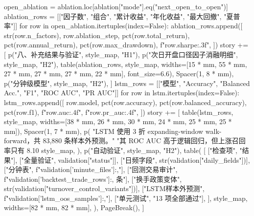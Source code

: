 \documentclass[UTF8,a4paper,fontset=fandol]{ctexart}
\begin{document}
\begin{ProjectCode}
    open_ablation = ablation.loc[ablation["mode"].eq("next_open_to_open")]
    ablation_rows = [["因子数", "组合", "累计收益", "年化收益", "最大回撤", "夏普率"]]
    for row in open_ablation.itertuples(index=False):
        ablation_rows.append([
            str(row.n_factors),
            row.ablation_step,
            pct(row.total_return),
            pct(row.annual_return),
            pct(row.max_drawdown),
            f"{row.sharpe:.3f}",
        ])
    story += [
        p("八、补充结果与验证", style_map, "H1"),
        p("次日开盘口径因子消融明细", style_map, "H2"),
        table(ablation_rows, style_map, widths=[15 * mm, 55 * mm, 27 * mm, 27 * mm, 27 * mm, 22 * mm], font_size=6.6),
        Spacer(1, 8 * mm),
        p("分钟级模型", style_map, "H2"),
    ]
    lstm_rows = [["模型", "Accuracy", "Balanced Acc.", "F1", "ROC AUC", "PR AUC"]]
    for row in lstm.itertuples(index=False):
        lstm_rows.append([
            row.model,
            pct(row.accuracy),
            pct(row.balanced_accuracy),
            pct(row.f1),
            f"{row.auc:.4f}",
            f"{row.pr_auc:.4f}",
        ])
    story += [
        table(lstm_rows, style_map, widths=[38 * mm, 26 * mm, 30 * mm, 24 * mm, 25 * mm, 25 * mm]),
        Spacer(1, 7 * mm),
        p(
            "LSTM 使用 3 折 expanding-window walk-forward，共 83,880 条样本外预测。"
            "其 ROC AUC 高于逻辑回归，但上涨召回率只有 8.10%
            style_map,
        ),
        p("自动验证", style_map, "H2"),
        table(
            [
                ["检查项", "结果"],
                ["全量验证", validation["status"]],
                ["日频字段", str(validation["daily_fields"])],
                ["分钟表", f"{validation['minute_files']:,}"],
                ["回测交易审计", f"{validation['backtest_trade_rows']:,} 条"],
                ["换手政策变体", str(validation["turnover_control_variants"])],
                ["LSTM样本外预测", f"{validation['lstm_oos_samples']:,}"],
                ["单元测试", "13 项全部通过"],
            ],
            style_map,
            widths=[82 * mm, 82 * mm],
        ),
        PageBreak(),
    ]


\end{ProjectCode}
\end{document}

